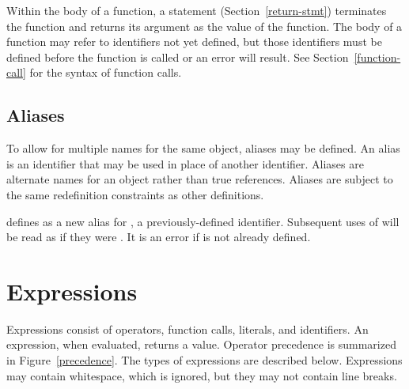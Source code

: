 Within the body of a function, a  statement
(Section~\ref{return-stmt}) terminates the function and returns its
argument as the value of the function.  The body of a function may
refer to identifiers not yet defined, but those identifiers must be
defined before the function is called or an error will result.  See
Section~\ref{function-call} for the syntax of function calls.


\subsection{Aliases}

To allow for multiple names for the same object, aliases may be
defined.  An alias is an identifier that may be used in place of
another identifier.  Aliases are alternate names for an object rather
than true references.  Aliases are subject to the same redefinition
constraints as other definitions.

\begin{syntax}
   
\end{syntax}
defines  as a new alias for , a previously-defined
identifier.  Subsequent uses of  will be read as if they were
.  It is an error if  is not already defined.



\section{Expressions}
\label{expressions}

Expressions consist of operators, function calls, literals, and
identifiers.  An expression, when evaluated, returns a value.
Operator precedence is summarized in Figure~\ref{precedence}.  The
types of expressions are described below.  Expressions may contain
whitespace, which is ignored, but they may not contain line breaks.

